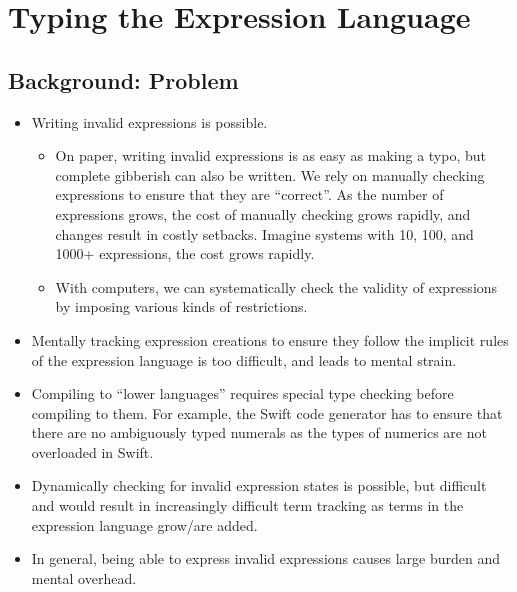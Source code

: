 \chapter{Typing the Expression Language}
\label{chap:typedExpr}

\section{Background: Problem}

\begin{itemize}

      \item Writing invalid expressions is possible.
            \begin{itemize}

                  \item On paper, writing invalid expressions is as easy as
                        making a typo, but complete gibberish can also be
                        written. We rely on manually checking expressions to
                        ensure that they are ``correct''. As the number of
                        expressions grows, the cost of manually checking grows
                        rapidly, and changes result in costly setbacks. Imagine
                        systems with 10, 100, and 1000+ expressions, the cost
                        grows rapidly.

                  \item With computers, we can systematically check the validity
                        of expressions by imposing various kinds of
                        restrictions.

            \end{itemize}

      \item Mentally tracking expression creations to ensure they follow the
            implicit rules of the expression language is too difficult, and
            leads to mental strain.

      \item Compiling to ``lower languages'' requires special type checking
            before compiling to them. For example, the Swift code generator has
            to ensure that there are no ambiguously typed numerals as the types
            of numerics are not overloaded in Swift.

      \item Dynamically checking for invalid expression states is possible, but
            difficult and would result in increasingly difficult term tracking
            as terms in the expression language grow/are added.

      \item In general, being able to express invalid expressions causes large
            burden and mental overhead.

\end{itemize}


